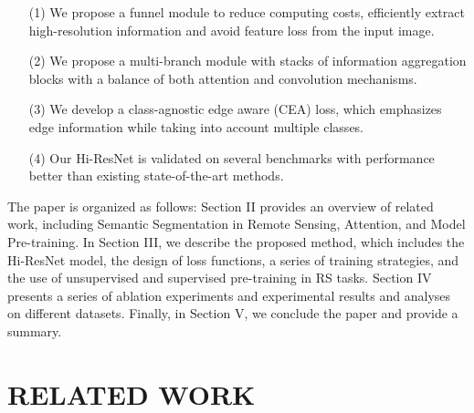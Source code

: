 \documentclass[journal]{IEEEtran}
\begin{document}
\begin{itemize}
\item[(1)] We propose a funnel module to reduce computing costs, efficiently extract high-resolution information and avoid feature loss from the input image.
\item[(2)] We propose a multi-branch module with stacks of information aggregation blocks with a balance of both attention and convolution mechanisms. 
\item[(3)] We develop a class-agnostic edge aware (CEA) loss, which emphasizes edge information while taking into account multiple classes.
\item[(4)] Our Hi-ResNet is validated on several benchmarks with performance better than existing state-of-the-art methods.
\end{itemize}

The paper is organized as follows: Section II provides an overview of related work, including Semantic Segmentation in Remote Sensing, Attention, and Model Pre-training. In Section III, we describe the proposed method, which includes the Hi-ResNet model, the design of loss functions, a series of training strategies, and the use of unsupervised and supervised pre-training in RS tasks. Section IV presents a series of ablation experiments and experimental results and analyses on different datasets. Finally, in Section V, we conclude the paper and provide a summary.

\section{RELATED WORK}
\end{document}
